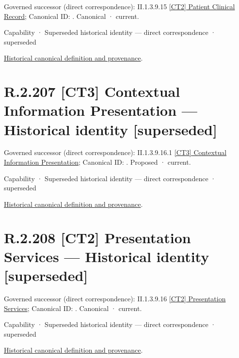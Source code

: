 {\small Governed successor (direct correspondence): II.1.3.9.15 \hyperref[element:5478878e0e6e4d34a8d5023ac6ac2d54]{[CT2] Patient Clinical Record}; Canonical ID: \texttt{}. Canonical · current.}\par
\label{element:2e4de521bda24ad7b0ea64ae535b7f84}
{\small Capability · Superseded historical identity — direct correspondence · superseded}\par
\href{../../../../../../../continuum/strategy/capability/2e4de521bda24ad7b0ea64ae535b7f84.md}{Historical canonical definition and provenance}.\par
\section*{R.2.207 [CT3] Contextual Information Presentation — Historical identity [superseded]}
\label{navigation:R.2.207}

{\small Governed successor (direct correspondence): II.1.3.9.16.1 \hyperref[element:9f900c53ae56488cad69e53c2205e898]{[CT3] Contextual Information Presentation}; Canonical ID: \texttt{}. Proposed · current.}\par
\label{element:e349d5f6a8774bbe8d150f9c51af770c}
{\small Capability · Superseded historical identity — direct correspondence · superseded}\par
\href{../../../../../../../continuum/strategy/capability/e349d5f6a8774bbe8d150f9c51af770c.md}{Historical canonical definition and provenance}.\par
\section*{R.2.208 [CT2] Presentation Services — Historical identity [superseded]}
\label{navigation:R.2.208}

{\small Governed successor (direct correspondence): II.1.3.9.16 \hyperref[element:e9b6ba1917ba44cca7466444d0836c98]{[CT2] Presentation Services}; Canonical ID: \texttt{}. Canonical · current.}\par
\label{element:c89e7c8b277247d9965fdb534aad2d1f}
{\small Capability · Superseded historical identity — direct correspondence · superseded}\par
\href{../../../../../../../continuum/strategy/capability/c89e7c8b277247d9965fdb534aad2d1f.md}{Historical canonical definition and provenance}.\par
